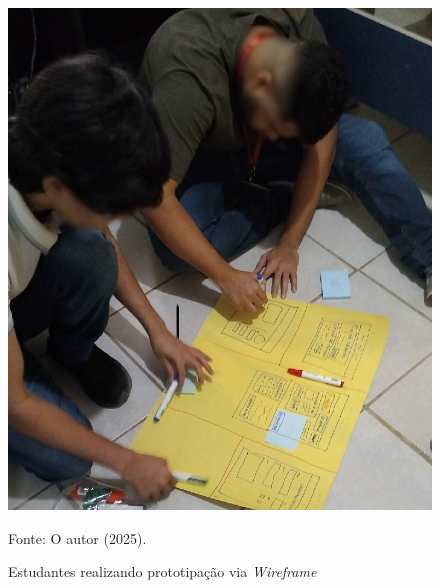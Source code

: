 \begin{figure}[H]
    \caption{Estudantes realizando prototipação via \textit{Wireframe}}
    \centering
    \includegraphics[width=0.6\linewidth]{images/metodologia/ong002.jpeg}
    \label{fig:ong002}
    \vspace{0.2cm}

{\centering Fonte: O autor (2025). \par}
\end{figure}
